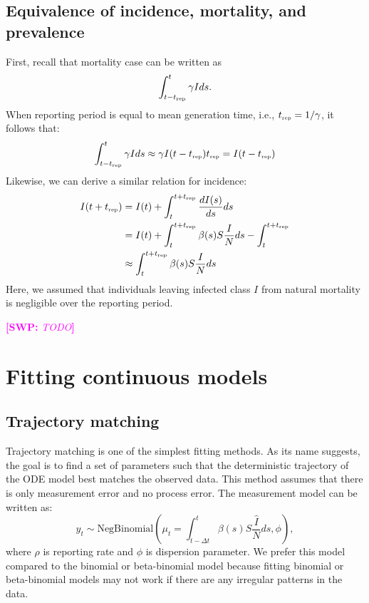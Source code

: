 \documentclass{article}
\newcommand{\comment}[3]{\textcolor{#1}{\textbf{[#2: }\textsl{#3}\textbf{]}}}
\newcommand{\swp}[1]{\comment{magenta}{SWP}{#1}}
\newcommand{\tsub}[2]{#1_{{\textrm{\tiny #2}}}}
\begin{document}
\subsection{Equivalence of incidence, mortality, and prevalence}

First, recall that mortality case can be written as
\begin{equation}
\int_{t-\tsub{t}{rep}}^{t} \gamma I ds.
\end{equation}
When reporting period is equal to mean generation time, i.e., $\tsub{t}{rep} = 1/\gamma$, 
it follows that:
\begin{equation}
\int_{t-\tsub{t}{rep}}^{t} \gamma I ds \approx \gamma I(t-\tsub{t}{rep}) \tsub{t}{rep} = I(t-\tsub{t}{rep})
\end{equation}
Likewise, we can derive a similar relation for incidence:
\begin{equation}
\begin{aligned}
I(t+\tsub{t}{rep}) &= I(t) + \int_{t}^{t+\tsub{t}{rep}} \frac{dI(s)}{ds} ds\\
&= I(t) + \int_{t}^{t+\tsub{t}{rep}} \beta(s) S \frac{I}{N} ds - \int_{t}^{t+\tsub{t}{rep}}\\
&\approx \int_{t}^{t+\tsub{t}{rep}} \beta(s) S \frac{I}{N} ds
\end{aligned}
\end{equation}
Here, we assumed that individuals leaving infected class $I$ from natural mortality is negligible over the reporting period.

\swp{TODO}


\section{Fitting continuous models}

\subsection{Trajectory matching}

Trajectory matching is one of the simplest fitting methods.
As its name suggests, the goal is to find a set of parameters such that the deterministic trajectory of the ODE model best matches the observed data.
This method assumes that there is only measurement error and no process error.
The measurement model can be written as:
\begin{equation}
y_t \sim \mathrm{NegBinomial}\left(\mu_t= \int_{t-\Delta t}^{t} \beta(s) S \frac{\hat{I}}{N} ds, \phi \right),
\end{equation}
where $\rho$ is reporting rate and $\phi$ is dispersion parameter.
We prefer this model compared to the binomial or beta-binomial model because fitting binomial or beta-binomial models may not work if there are any irregular patterns in the data.
\end{document}
